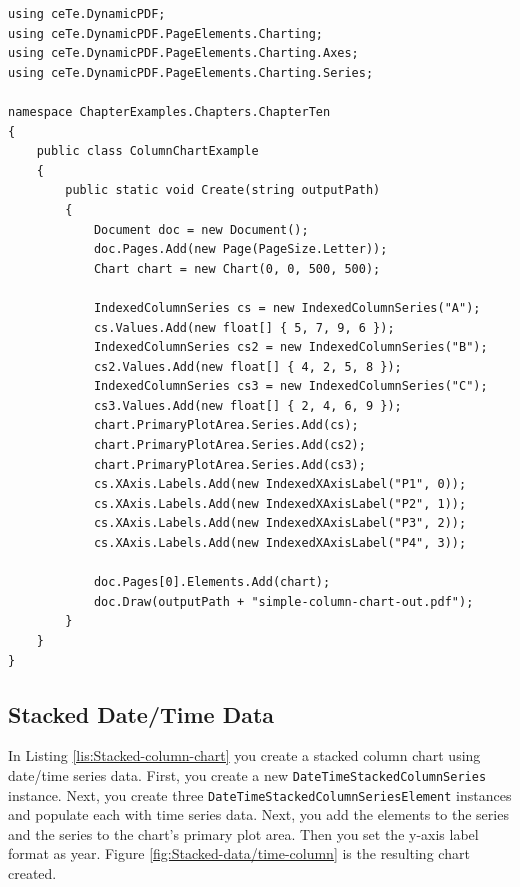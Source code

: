 \documentclass[american,letterpaper]{tufte-book}
\numberwithin{equation}{section}
\numberwithin{figure}{section}
\begin{document}
{\bgroup{}
\begin{lstlisting}[caption={Column chart with indexed data.},label={lis:Column-chart-with},basicstyle={\small\ttfamily},breaklines=true]
using ceTe.DynamicPDF;
using ceTe.DynamicPDF.PageElements.Charting;
using ceTe.DynamicPDF.PageElements.Charting.Axes;
using ceTe.DynamicPDF.PageElements.Charting.Series;

namespace ChapterExamples.Chapters.ChapterTen
{
    public class ColumnChartExample
    {
        public static void Create(string outputPath)
        {
            Document doc = new Document();
            doc.Pages.Add(new Page(PageSize.Letter));
            Chart chart = new Chart(0, 0, 500, 500);

            IndexedColumnSeries cs = new IndexedColumnSeries("A");
            cs.Values.Add(new float[] { 5, 7, 9, 6 });
            IndexedColumnSeries cs2 = new IndexedColumnSeries("B");
            cs2.Values.Add(new float[] { 4, 2, 5, 8 });
            IndexedColumnSeries cs3 = new IndexedColumnSeries("C");
            cs3.Values.Add(new float[] { 2, 4, 6, 9 });
            chart.PrimaryPlotArea.Series.Add(cs);
            chart.PrimaryPlotArea.Series.Add(cs2);
            chart.PrimaryPlotArea.Series.Add(cs3);
            cs.XAxis.Labels.Add(new IndexedXAxisLabel("P1", 0));
            cs.XAxis.Labels.Add(new IndexedXAxisLabel("P2", 1));
            cs.XAxis.Labels.Add(new IndexedXAxisLabel("P3", 2));
            cs.XAxis.Labels.Add(new IndexedXAxisLabel("P4", 3));

            doc.Pages[0].Elements.Add(chart);
            doc.Draw(outputPath + "simple-column-chart-out.pdf");
        }
    }
}
\end{lstlisting}
\leavevmode\egroup


\subsection{Stacked Date/Time Data}

In Listing \ref{lis:Stacked-column-chart} you create a stacked column
chart using date/time series data. First, you create a new \texttt{DateTimeStackedColumnSeries}
instance. Next, you create three \texttt{DateTimeStackedColumnSeriesElement}
instances and populate each with time series data. Next, you add the
elements to the series and the series to the chart's primary plot
area. Then you set the y-axis label format as year. Figure \ref{fig:Stacked-data/time-column}
is the resulting chart created.

}
\end{document}
